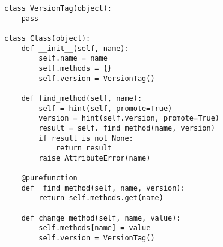 \begin{lstlisting}[mathescape,basicstyle=\ttfamily]
class VersionTag(object):
    pass

class Class(object):
    def __init__(self, name):
        self.name = name
        self.methods = {}
        self.version = VersionTag()

    def find_method(self, name):
        self = hint(self, promote=True)
        version = hint(self.version, promote=True)
        result = self._find_method(name, version)
        if result is not None:
            return result
        raise AttributeError(name)

    @purefunction
    def _find_method(self, name, version):
        return self.methods.get(name)

    def change_method(self, name, value):
        self.methods[name] = value
        self.version = VersionTag()
\end{lstlisting}
